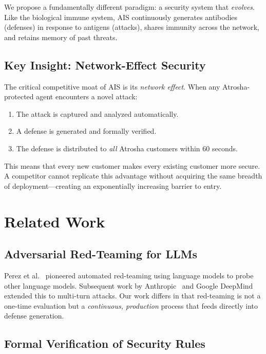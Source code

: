 \documentclass[conference]{IEEEtran}
\begin{document}
We propose a fundamentally different paradigm: a security system that \textit{evolves}. Like the biological immune system, AIS continuously generates antibodies (defenses) in response to antigens (attacks), shares immunity across the network, and retains memory of past threats.

\subsection{Key Insight: Network-Effect Security}

The critical competitive moat of AIS is its \textit{network effect}. When any Atrosha-protected agent encounters a novel attack:
\begin{enumerate}
    \item The attack is captured and analyzed automatically.
    \item A defense is generated and formally verified.
    \item The defense is distributed to \textit{all} Atrosha customers within 60 seconds.
\end{enumerate}

This means that every new customer makes every existing customer more secure. A competitor cannot replicate this advantage without acquiring the same breadth of deployment---creating an exponentially increasing barrier to entry.

\section{Related Work}

\subsection{Adversarial Red-Teaming for LLMs}

Perez et al.~\cite{perez2022} pioneered automated red-teaming using language models to probe other language models. Subsequent work by Anthropic~\cite{ganguli2022} and Google DeepMind~\cite{samvelyan2024} extended this to multi-turn attacks. Our work differs in that red-teaming is not a one-time evaluation but a \textit{continuous, production} process that feeds directly into defense generation.

\subsection{Formal Verification of Security Rules}
\end{document}
